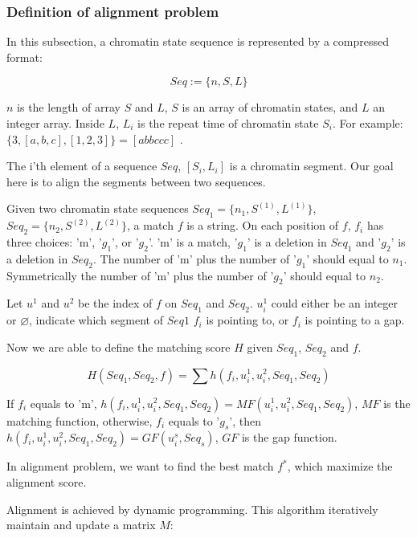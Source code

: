 \documentclass[a4paper]{article}
\begin{document}
\begin{CJK*}{UTF8}{kai}
\subsubsection{Definition of alignment problem}

In this subsection, a chromatin state sequence is represented by a compressed format: 

$$Seq := \{n,S,L\}$$

$n$ is the length of array $S$ and $L$, $S$ is an array of chromatin states, and $L$ an integer array. Inside $L$, $L_i$ is the repeat time of chromatin state $S_i$. For example: $\{3,[a,b,c],[1,2,3]\} = [abbccc]$ .

The i'th element of a sequence $Seq$, $[S_i,L_i]$ is a chromatin segment. Our goal here is to align the segments between two sequences.

Given two chromatin state sequences $Seq_1=\{n_1,S^{(1)},L^{(1)}\}$, $Seq_2=\{n_2,S^{(2)},L^{(2)}\}$, a match $f$ is a string. On each position of $f$, $f_i$ has three choices: 'm', '$g_1$', or '$g_2$'. 'm' is a match, '$g_1$' is a deletion in $Seq_1$ and '$g_2$' is a deletion in $Seq_2$. The number of 'm' plus the number of '$g_1$' should equal to $n_1$. Symmetrically the number of 'm' plus the number of '$g_2$' should equal to $n_2$. 

Let $u^1$ and $u^2$ be the index of $f$ on $Seq_1$ and $Seq_2$. $u^1_i$ could either be an integer or $\varnothing$, indicate which segment of $Seq1$ $f_i$ is pointing to, or $f_i$ is pointing to a gap.

Now we are able to define the matching score $H$ given $Seq_1$, $Seq_2$ and $f$.

$$H(Seq_1,Seq_2,f) = \sum{h(f_i,u^1_i,u^2_i,Seq_1,Seq_2)}$$

If $f_i$ equals to 'm', $h(f_i,u^1_i,u^2_i,Seq_1,Seq_2) = MF(u^1_i,u^2_i,Seq_1,Seq_2)$, $MF$ is the matching function, otherwise, $f_i$ equals to '$g_s$', then $h(f_i,u^1_i,u^2_i,Seq_1,Seq_2) = GF(u^s_i,Seq_s)$, $GF$ is the gap function.

In alignment problem, we want to find the best match $f^*$, which maximize the alignment score.

Alignment is achieved by dynamic programming. This algorithm iteratively maintain and update a matrix $M$:


\end{CJK*}
\end{document}
